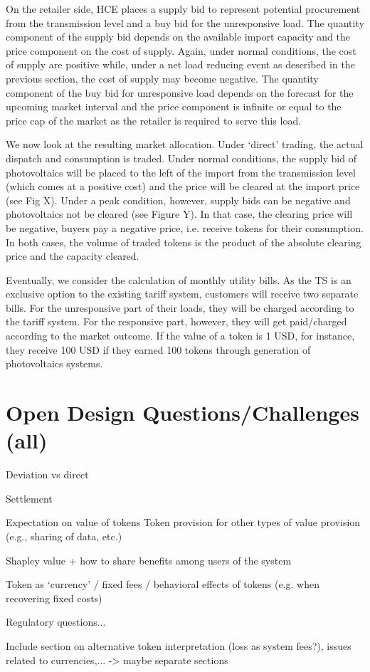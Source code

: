 On the retailer side, HCE places a supply bid to represent potential procurement from the transmission level and a buy bid for the unresponsive load. The quantity component of the supply bid depends on the available import capacity and the price component on the cost of supply. Again, under normal conditions, the cost of supply are positive while, under a net load reducing event as described in the previous section, the cost of supply may become negative. The quantity component of the buy bid for unresponsive load depends on the forecast for the upcoming market interval and the price component is infinite or equal to the price cap of the market as the retailer is required to serve this load.

We now look at the resulting market allocation. Under `direct' trading, the actual dispatch and consumption is traded. 
Under normal conditions, the supply bid of photovoltaics will be placed to the left of the import from the transmission level (which comes at a positive cost) and the price will be cleared at the import price (see Fig X).
Under a peak condition, however, supply bids can be negative and photovoltaics not be cleared (see Figure Y). In that case, the clearing price will be negative, buyers pay a negative price, i.e. receive tokens for their consumption. 
In both cases, the volume of traded tokens is the product of the absolute clearing price and the capacity cleared.

Eventually, we consider the calculation of monthly utility bills. As the TS is an exclusive option to the existing tariff system, customers will receive two separate bills. For the unresponsive part of their loads, they will be charged according to the tariff system. For the responsive part, however, they will get paid/charged according to the market outcome. If the value of a token is 1 USD, for instance, they receive 100 USD if they earned 100 tokens through generation of photovoltaics systems. 

\section{Open Design Questions/Challenges (all)}

Deviation vs direct

Settlement

Expectation on value of tokens
Token provision for other types of value provision (e.g., sharing of data, etc.)

Shapley value + how to share benefits among users of the system

Token as `currency' / fixed fees / behavioral effects of tokens (e.g. when recovering fixed costs)

Regulatory questions...

Include section on alternative token interpretation (loss as system fees?), issues related to currencies,... -> maybe separate sections